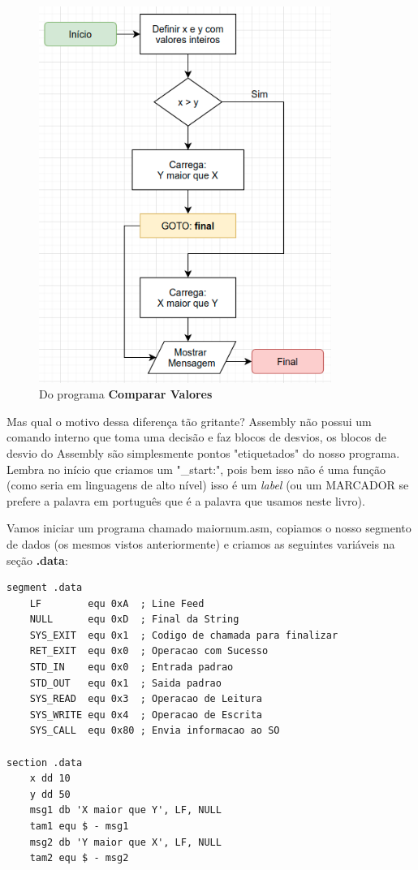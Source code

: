 \begin{figure}[ht]
\begin{minipage}[b]{0.45\linewidth}
		\includegraphics[width=0.85\textwidth]{Pictures/cap01/programa3}
		\caption{Do programa \textbf{Comparar Valores}}
	\end{minipage}
\end{figure}

Mas qual o motivo dessa diferença tão gritante? Assembly não possui um comando interno que toma uma decisão e faz blocos de desvios, os blocos de desvio do Assembly são simplesmente pontos "etiquetados" do nosso programa. Lembra no início que criamos um "\_start:", pois bem isso não é uma função (como seria em linguagens de alto nível) isso é um \textit{label} (ou um MARCADOR se prefere a palavra em português que é a palavra que usamos neste livro).

Vamos iniciar um programa chamado maiornum.asm, copiamos o nosso segmento de dados (os mesmos vistos anteriormente) e criamos as seguintes variáveis na seção \textbf{.data}:
\begin{lstlisting}[]
segment .data
	LF        equ 0xA  ; Line Feed
	NULL      equ 0xD  ; Final da String
	SYS_EXIT  equ 0x1  ; Codigo de chamada para finalizar
	RET_EXIT  equ 0x0  ; Operacao com Sucesso
	STD_IN    equ 0x0  ; Entrada padrao
	STD_OUT   equ 0x1  ; Saida padrao
	SYS_READ  equ 0x3  ; Operacao de Leitura
	SYS_WRITE equ 0x4  ; Operacao de Escrita
	SYS_CALL  equ 0x80 ; Envia informacao ao SO

section .data
	x dd 10
	y dd 50
	msg1 db 'X maior que Y', LF, NULL
	tam1 equ $ - msg1
	msg2 db 'Y maior que X', LF, NULL
	tam2 equ $ - msg2
\end{lstlisting}

